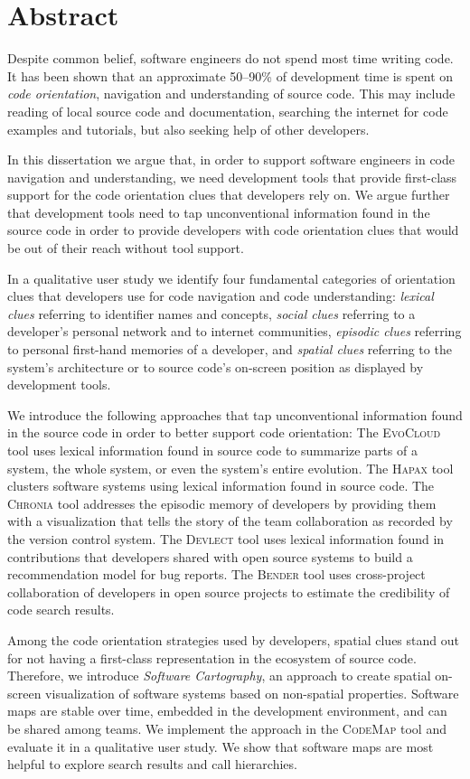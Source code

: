 \chapter*{Abstract}

Despite common belief, software engineers do not spend most time writing code. It has been shown that an approximate 50--90\% of development time is spent on \emph{code orientation}, \ie navigation and understanding of source code. This may include reading of local source code and documentation, searching the internet for code examples and tutorials, but also seeking help of other developers. 

In this dissertation we argue that, in order to support software engineers in code navigation and understanding, we need development tools that provide first-class support for the code orientation clues that developers rely on. We argue further that development tools need to tap unconventional information found in the source code in order to provide developers with code orientation clues that would be out of their reach without tool support.

In a qualitative user study we identify four fundamental categories of orientation clues that developers use for code navigation and code understanding: \emph{lexical clues} referring to identifier names and concepts, \emph{social clues} referring to a developer's personal network and to internet communities, \emph{episodic clues} referring to personal first-hand memories of a developer, and \emph{spatial clues} referring to the system's architecture or to source code's on-screen position as displayed by development tools.

We introduce the following approaches that tap unconventional information found in the source code in order to better support code orientation:
%
The \textsc{EvoCloud} tool uses lexical information found in source code to summarize parts of a system, the whole system, or even the system's entire evolution. The \textsc{Hapax} tool clusters software systems using lexical information found in source code. The \textsc{Chronia} tool addresses the episodic memory of developers by providing them with a visualization that tells the story of the team collaboration as recorded by the version control system. The \textsc{Devlect} tool uses lexical information found in contributions that developers shared with open source systems to build a recommendation model for bug reports. The \textsc{Bender} tool uses cross-project collaboration of developers in open source projects to estimate the credibility of code search results.

Among the code orientation strategies used by developers, spatial clues stand out for not having a first-class representation in the ecosystem of source code. Therefore, we introduce \emph{Software Cartography}, an approach to create spatial on-screen visualization of software systems based on non-spatial properties. Software maps are stable over time, embedded in the development environment, and can be shared among teams. We implement the approach in the \textsc{CodeMap} tool and evaluate it in a qualitative user study. We show that software maps are most helpful to explore search results and call hierarchies.